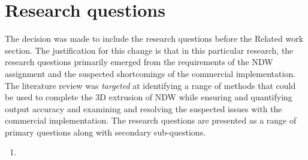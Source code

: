
\chapter{Research questions}
\label{chap:rq}

The decision was made to include the research questions before the Related work section. The justification for this change is that in this particular research, the research questions primarily emerged from the requirements of the NDW assignment and the suspected shortcomings of the commercial implementation. The literature review was \textit{targeted} at identifying a range of methods that could be used to complete the 3D extrusion of NDW while ensuring and quantifying output accuracy and examining and resolving the suspected issues with the commercial implementation. The research questions are presented as a range of primary questions along with secondary sub-questions.

\begin{enumerate}
\item 
\end{enumerate}
